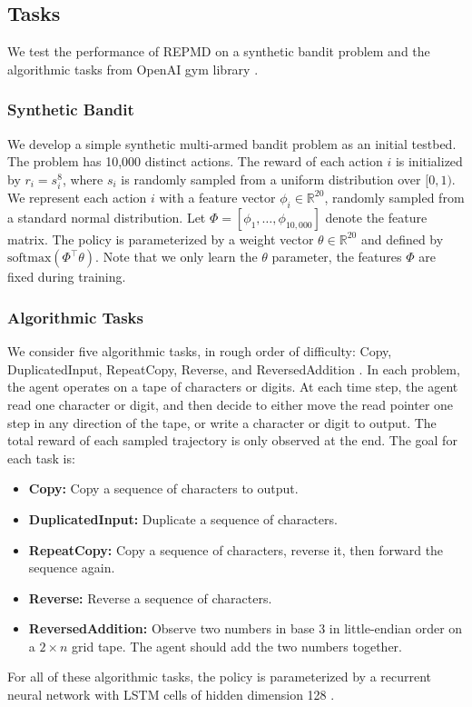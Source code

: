 \documentclass{article} %
\begin{document}
\subsection{Tasks}
We test the performance of REPMD on a synthetic bandit problem and the algorithmic tasks from OpenAI gym library \citep{brockman2016openai}.  
\subsubsection{Synthetic Bandit}

We develop a simple synthetic multi-armed bandit problem as an initial testbed. The problem has 10,000 distinct actions. The reward of each action $i$ is initialized by $r_i = s_i^{8}$, where $s_i$ is randomly sampled from a uniform distribution over $[0,1)$. We represent each action $i$ with a feature vector $\phi_i\in \mathbb{R}^{20}$, randomly sampled from a standard normal distribution. Let $\Phi=[\phi_1,\dots,\phi_{10,000}]$ denote the feature matrix. The policy is parameterized by a weight vector $\theta\in  \mathbb{R}^{20}$ and  defined by $\text{softmax}(\Phi^{\top}\theta)$. Note that we only learn the $\theta$ parameter, the features $\Phi$ are fixed during training. 

\subsubsection{Algorithmic Tasks}

We consider five algorithmic tasks, in rough order of difficulty: Copy, DuplicatedInput, RepeatCopy, Reverse, and ReversedAddition \citep{brockman2016openai}. In each problem, the agent operates on a tape of characters or digits. At each time step, the agent read one character or digit, and then decide to either move the read pointer one step in any direction of the tape, or write a character or digit to output. The total reward of each sampled trajectory is only observed at the end. The goal for each task is:
\begin{itemize}
\item \textbf{Copy:} Copy a sequence of characters to output. 
\item \textbf{DuplicatedInput:} Duplicate a sequence of characters.
\item \textbf{RepeatCopy:} Copy a sequence of characters, reverse it, then forward the sequence again. 
\item \textbf{Reverse:} Reverse a sequence of characters.
\item \textbf{ReversedAddition:} Observe two numbers in base 3 in little-endian order on a $2\times n$ grid tape. The agent should add the two numbers together. 
\end{itemize}
For all of these algorithmic tasks, the policy is parameterized by a recurrent neural network with LSTM cells of hidden dimension 128 \citep{hochreiter1997long}. 
\end{document}
